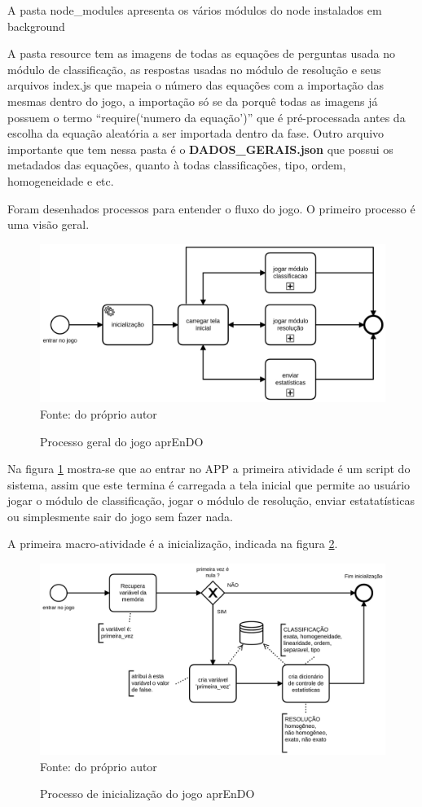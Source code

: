 A pasta node\_modules apresenta os vários módulos do node instalados em background

A pasta resource tem as imagens de todas as equações de perguntas usada no módulo de classificação, as respostas usadas no módulo de resolução e seus arquivos index.js que mapeia o número das equações com a importação  das mesmas dentro do jogo, a importação só se da porquê todas as imagens já possuem o termo “require(‘numero da equação’)” que é pré-processada antes da escolha da equação aleatória a ser importada dentro da fase. Outro arquivo importante que tem nessa pasta é o \textbf{DADOS\_GERAIS.json} que possui os metadados das equações, quanto à todas classificações, tipo, ordem, homogeneidade e etc.

Foram desenhados processos para entender o fluxo do jogo. O primeiro processo é uma visão geral.

\begin{figure}[H]
\centering
\caption{Processo geral do jogo aprEnDO}
\includegraphics[scale=0.2]{figuras/processos/processo_geral.png}
\label{pg}
\\
\small{Fonte: do próprio autor}
\end{figure}

Na figura \ref{pg} mostra-se que ao entrar no APP a primeira atividade é um script do sistema, assim que este termina é carregada a tela inicial que permite ao usuário jogar o módulo de classificação, jogar o módulo de resolução, enviar estatatísticas ou simplesmente sair do jogo sem fazer nada.

A primeira macro-atividade é a inicialização, indicada na figura \ref{inic}.

\begin{figure}[H]
\centering
\caption{Processo de inicialização do jogo aprEnDO}
\includegraphics[scale=0.2]{figuras/processos/proccesso_inicializacao.png}
\label{inic}
\small{Fonte: do próprio autor}
\end{figure}

